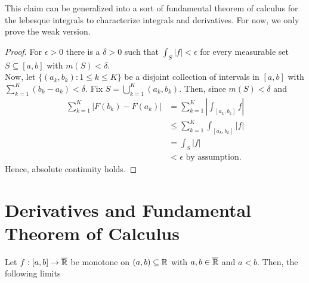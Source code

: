 This claim can be generalized into a sort of fundamental theorem of calculus for the lebesque integrals to characterize integrals and derivatives. For now, we only prove the weak version.
\begin{proof}
	For \(\epsilon > 0\) 	there is a \(\delta > 0\) such that \(\int _{S} \left| f \right| < \epsilon\) for every measurable set \(S \subseteq \left[ a, b \right] \) with \(m\left( S \right) < \delta\).\\
	Now, let \(\{\left( a_{k}, b_{k} \right) : 1 \le k \le K\} \) be a disjoint collection of intervals in \(\left[ a, b \right] \) with \(\sum_{k=1}^{K}\left( b_{k} - a_{k} \right) < \delta\). Fix \(S = \bigcup_{k=1} ^{K}\left( a_{k}, b_{k} \right) \). Then, since \(m\left( S \right)  < \delta\) and
	\begin{align*}
		\sum_{k=1}^{K} \left| F\left( b_{k} \right)  - F\left( a_{k} \right)  \right| &=  \sum_{k=1}^{K} \left| \int_{\left[ a_{k}, b_{k} \right] } f \right|  \\
											      &\le \sum_{k=1}^{K}  \int_{\left[ a_{k}, b_{k} \right] } \left| f \right| \\
											      &= \int_{S} \left| f \right|   \\
											      &< \epsilon \text{ by assumption}
	.\end{align*}
	Hence, absolute continuity holds.
\end{proof}
\section{Derivatives and Fundamental Theorem of Calculus}
\begin{proposition}
	Let \(f: \left[ a, b \right]  \to \overline{\mathbb{R}}\) be monotone on \(\left( a, b \right) \subseteq \mathbb{R}\) with \(a, b \in \overline{\mathbb{R}}\) and  \(a < b\). Then, the following limits
\end{proposition}
